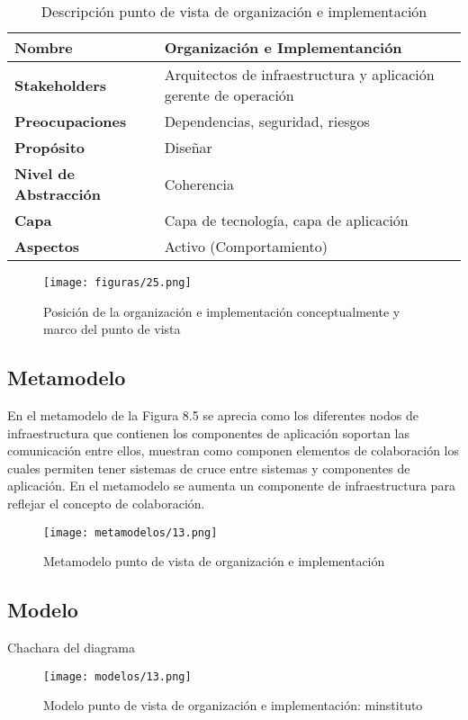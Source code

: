   \begin{table}[!h]
  	\centering
  	\begin{tabular}{lp{8cm}}
  		\toprule
  		\textbf{Nombre} & \textbf{Organización e Implementanción} \\
  		\midrule
  		\textbf{Stakeholders} & Arquitectos de infraestructura y aplicación gerente de operación \\
  		\textbf{Preocupaciones} & Dependencias, seguridad, riesgos \\
  		\textbf{Propósito} & Diseñar \\
  		\textbf{Nivel de Abstracción} & Coherencia \\
  		\textbf{Capa} & Capa de tecnología, capa de aplicación \\
  		\textbf{Aspectos} & Activo (Comportamiento) \\
  		\bottomrule
  	\end{tabular}
  	\captionsetup{width=.95\textwidth}
  	\caption{Descripción punto de vista de organización e implementación}
  	\label{tabla16}
  \end{table}
  
  \begin{figure}[!h]
  	\centering
  	\texttt{[image: figuras/25.png]}
  	\captionsetup{width=.95\textwidth}
  	\caption{Posición de la organización e implementación conceptualmente y marco del punto de vista}
  	\label{figura25}
  \end{figure}
  
  \subsection{Metamodelo}
  En el metamodelo de la Figura 8.5 se aprecia como los diferentes nodos de infraestructura que contienen los componentes de aplicación soportan las comunicación entre ellos, muestran como componen elementos de colaboración los cuales permiten tener sistemas de cruce entre sistemas y componentes de aplicación. En el metamodelo se aumenta un componente de infraestructura para reflejar el concepto de colaboración.
  
  \begin{figure}[!h]
  	\centering
  	\texttt{[image: metamodelos/13.png]}
  	\captionsetup{width=.95\textwidth}
  	\caption{Metamodelo punto de vista de organización e implementación}
  	\label{metamodelo13}
  \end{figure}
  
  \subsection{Modelo}Chachara del diagrama
  \begin{figure}[!h]
  	\centering
  	\texttt{[image: modelos/13.png]}
  	\captionsetup{width=.95\textwidth}
  	\caption{Modelo punto de vista de organización e implementación: minstituto}
  	\label{modelo13}
  \end{figure}

